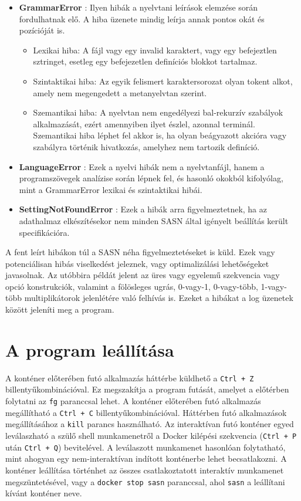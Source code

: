 \documentclass[twoside, 12pt]{report}
\begin{document}
\begin{itemize}[noitemsep]
  \item \textbf{GrammarError} : Ilyen hibák a nyelvtani leírások elemzése során fordulhatnak elő. A hiba üzenete mindig leírja annak pontos okát és pozícióját is.
    \begin{itemize}[noitemsep]
      \item Lexikai hiba: A fájl vagy egy invalid karaktert, vagy egy befejeztlen sztringet, esetleg egy befejezetlen definíciós blokkot tartalmaz.
      \item Szintaktikai hiba: Az egyik felismert karaktersorozat olyan tokent alkot, amely nem megengedett a metanyelvtan szerint.
      \item Szemantikai hiba: A nyelvtan nem engedélyezi bal-rekurzív szabályok alkalmazását, ezért amennyiben ilyet észlel, azonnal terminál. Szemantikai hiba léphet fel akkor is, ha olyan beágyazott akcióra vagy szabályra történik hivatkozás, amelyhez nem tartozik definíció.
    \end{itemize}
  \item \textbf{LanguageError} : Ezek a nyelvi hibák nem a nyelvtanfájl, hanem a programszövegek analízise során lépnek fel, és hasonló okokból kifolyólag, mint a GrammarError lexikai és szintaktikai hibái.
  \item \textbf{SettingNotFoundError} : Ezek a hibák arra figyelmeztetnek, ha az adathalmaz elkészítésekor nem minden SASN által igényelt beállítás került specifikációra.
\end{itemize}

A fent leírt hibákon túl a SASN néha figyelmeztetéseket is küld. Ezek vagy potenciálisan hibás viselkedést jeleznek, vagy optimalizálási lehetőségeket javasolnak. Az utóbbira példát jelent az üres vagy egyelemű szekvencia vagy opció konstrukciók, valamint a fölösleges ugrás, 0-vagy-1, 0-vagy-több, 1-vagy-több multiplikátorok jelenlétére való felhívás is. Ezeket a hibákat a log üzenetek között jeleníti meg a program.

\section{A program leállítása}

A konténer előterében futó alkalmazás háttérbe küldhető a \verb|Ctrl + Z| billentyűkombinációval. Ez megszakítja a program futását, amelyet a előtérben folytatni az \verb|fg| paranccsal lehet. A konténer előterében futó alkalmazás megállítható a \verb|Ctrl + C| billentyűkombinációval. Háttérben futó alkalmazások megállításához a \verb|kill| parancs használható. Az interaktívan futó konténer egyed leválaszható a szülő shell munkamenetről a Docker kilépési szekvencia (\verb|Ctrl + P| után \verb|Ctrl + Q|) bevitelével. A leválaszott munkamenet hasonlóan folytatható, mint ahogyan egy nem-interaktívan indított konténerbe lehet becsatlakozni. A konténer leállítása történhet az összes csatlakoztatott interaktív munkamenet megszüntetésével, vagy a \verb|docker stop sasn| paranccsal, ahol \verb|sasn| a leállítani kívánt konténer neve.
\end{document}
